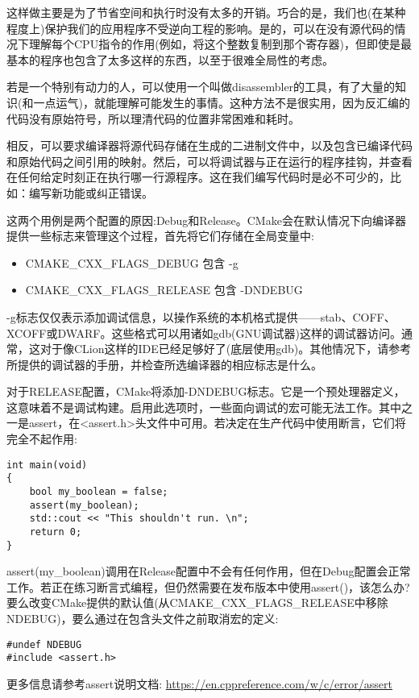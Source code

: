 这样做主要是为了节省空间和执行时没有太多的开销。巧合的是，我们也(在某种程度上)保护我们的应用程序不受逆向工程的影响。是的，可以在没有源代码的情况下理解每个CPU指令的作用(例如，将这个整数复制到那个寄存器)，但即使是最基本的程序也包含了太多这样的东西，以至于很难全局性的考虑。

若是一个特别有动力的人，可以使用一个叫做disassembler的工具，有了大量的知识(和一点运气)，就能理解可能发生的事情。这种方法不是很实用，因为反汇编的代码没有原始符号，所以理清代码的位置非常困难和耗时。

相反，可以要求编译器将源代码存储在生成的二进制文件中，以及包含已编译代码和原始代码之间引用的映射。然后，可以将调试器与正在运行的程序挂钩，并查看在任何给定时刻正在执行哪一行源程序。这在我们编写代码时是必不可少的，比如：编写新功能或纠正错误。

这两个用例是两个配置的原因:Debug和Release。CMake会在默认情况下向编译器提供一些标志来管理这个过程，首先将它们存储在全局变量中:

\begin{itemize}
\item 
CMAKE\_CXX\_FLAGS\_DEBUG 包含 -g

\item 
CMAKE\_CXX\_FLAGS\_RELEASE 包含 -DNDEBUG
\end{itemize}

-g标志仅仅表示添加调试信息，以操作系统的本机格式提供——stab、COFF、XCOFF或DWARF。这些格式可以用诸如gdb(GNU调试器)这样的调试器访问。通常，这对于像CLion这样的IDE已经足够好了(底层使用gdb)。其他情况下，请参考所提供的调试器的手册，并检查所选编译器的相应标志是什么。

对于RELEASE配置，CMake将添加-DNDEBUG标志。它是一个预处理器定义，这意味着不是调试构建。启用此选项时，一些面向调试的宏可能无法工作。其中之一是assert，在<assert.h>头文件中可用。若决定在生产代码中使用断言，它们将完全不起作用:

\begin{lstlisting}[style=styleCXX]
int main(void)
{
	bool my_boolean = false;
	assert(my_boolean);
	std::cout << "This shouldn't run. \n";
	return 0;
}
\end{lstlisting}

assert(my\_boolean)调用在Release配置中不会有任何作用，但在Debug配置会正常工作。若正在练习断言式编程，但仍然需要在发布版本中使用assert()，该怎么办?要么改变CMake提供的默认值(从CMAKE\_CXX\_FLAGS\_RELEASE中移除NDEBUG)，要么通过在包含头文件之前取消宏的定义:

\begin{lstlisting}[style=styleCXX]
#undef NDEBUG
#include <assert.h>
\end{lstlisting}

更多信息请参考assert说明文档: \url{https://en.cppreference.com/w/c/error/assert}
